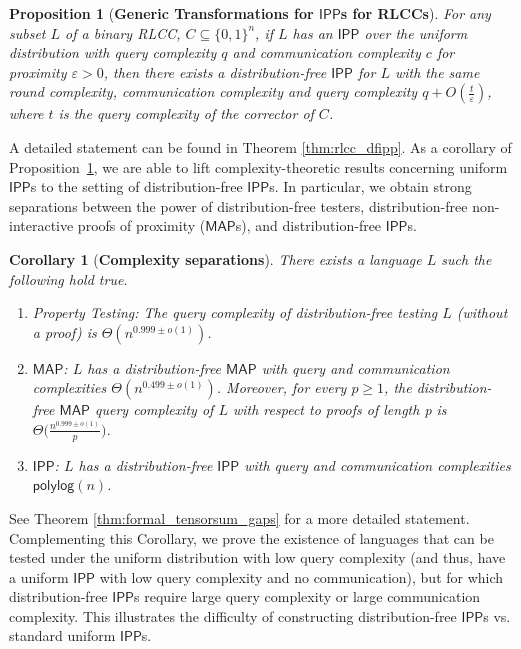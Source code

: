 \documentclass[11pt]{article}
\newtheorem{proposition}[theorem]{Proposition}
\newtheorem{corollary}[theorem]{Corollary}
\newcommand{\polylog}{\mathsf{polylog}}
\newcommand{\IPP}{\mathsf{IPP}}
\newcommand{\MAP}{\mathsf{MAP}}
\begin{document}
\begin{proposition}[\textbf{Generic Transformations for $\IPP$s for RLCCs}]
\label{thm:informal_locCorr}
For any subset $L$ of a binary RLCC, $C \subseteq \{0,1\}^n$, if $L$ has an $\IPP$ over the uniform distribution with query complexity $q$ and communication complexity $c$ for proximity $\varepsilon > 0$, then there exists a distribution-free $\IPP$ for $L$ with the same round complexity, communication complexity and query complexity $q+O(\frac{t}{\varepsilon})$, where $t$ is the query complexity of the corrector of $C$.
\end{proposition}


A detailed statement can be found in Theorem \ref{thm:rlcc_dfipp}. As a corollary of Proposition~\ref{thm:informal_locCorr}, we are able to lift complexity-theoretic results concerning uniform $\IPP$s to the setting of distribution-free $\IPP$s. In particular, we obtain strong separations between the power of distribution-free testers, distribution-free non-interactive proofs of proximity ($\MAP$s), and distribution-free $\IPP$s.


\begin{corollary}[\textbf{Complexity separations}]
\label{thm:informal_tensorsum_gaps}
    There exists a language $L$ such the following hold true.
    \begin{enumerate}
        \item \textsf{Property Testing}: The query complexity of distribution-free testing $L$ (without a proof) is $\Theta(n^{0.999\pm o(1)})$.
        \item $\MAP$: $L$ has a distribution-free $\MAP$ with query and communication complexities $\Theta(n^{0.499\pm o(1)})$. Moreover, for every $p \geq 1$, the distribution-free $\MAP$ query complexity of $L$ with respect to proofs of length p is $\Theta\big(\frac{n^{0.999\pm o(1)}}{p}\big)$.
        \item $\IPP$: $L$ has a distribution-free $\IPP$ with query and communication complexities $\polylog(n)$.
    \end{enumerate}
\end{corollary}
See Theorem \ref{thm:formal_tensorsum_gaps} for a more detailed statement. Complementing this Corollary, we prove the existence of languages that can be tested under the uniform distribution with low query complexity (and thus, have a uniform $\IPP$ with low query complexity and no communication), but for which distribution-free $\IPP$s require large query complexity or large communication complexity. This illustrates the difficulty of constructing distribution-free $\IPP$s vs. standard uniform $\IPP$s.
\end{document}
